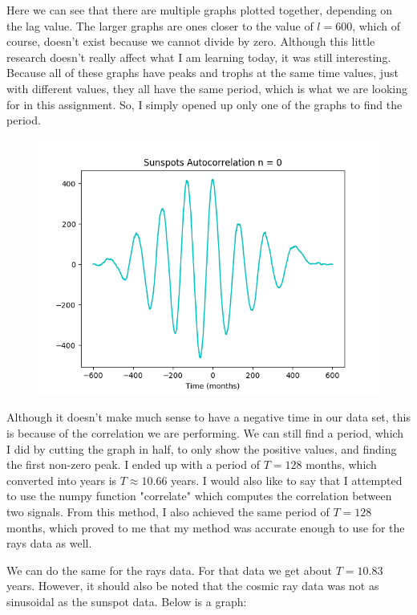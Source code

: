 \documentclass[12pt]{article}
\begin{document}
Here we can see that there are multiple graphs plotted together, depending on the lag value. The larger graphs are ones closer to the value of $l=600$, which of course, doesn't exist because we cannot divide by zero. Although this little research doesn't really affect what I am learning today, it was still interesting. Because all of these graphs have peaks and trophs at the same time values, just with different values, they all have the same period, which is what we are looking for in this assignment. So, I simply opened up only one of the graphs to find the period.

\begin{figure}[H]
\begin{center}
\includegraphics[scale=0.8]{ss_ac.png}
\end{center}
\end{figure}

Although it doesn't make much sense to have a negative time in our data set, this is because of the correlation we are performing. We can still find a period, which I did by cutting the graph in half, to only show the positive values, and finding the first non-zero peak. I ended up with a period of $T=128$ months, which converted into years is $T \approx 10.66$ years. I would also like to say that I attempted to use the numpy function "correlate" which computes the correlation between two signals. From this method, I also achieved the same period of $T=128$ months, which proved to me that my method was accurate enough to use for the rays data as well.


We can do the same for the rays data. For that data we get about $T=10.83$ years. However, it should also be noted that the cosmic ray data was not as sinusoidal as the sunspot data. Below is a graph:
\end{document}
